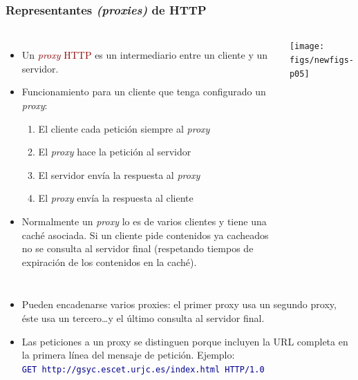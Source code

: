 \documentclass[hyperref={pdfpagelabels=true},ucs]{beamer}
\newcommand{\res}[1]{\textcolor{darkred}{#1}}
\begin{document}
\begin{frame}[fragile,shrink=15]
\frametitle{Representantes \emph{(proxies)} de HTTP}

\begin{columns}[c]
\column{80mm}

\begin{itemize}
\item Un \res{\textsl{proxy} HTTP} es un intermediario entre un
  cliente y un servidor.
\item Funcionamiento para un cliente que tenga configurado un \emph{proxy}: 
  \begin{enumerate}
  \item El cliente cada petición siempre al \emph{proxy}
  \item El \emph{proxy} hace la petición al servidor 
  \item El servidor envía la respuesta al \emph{proxy}
  \item El \emph{proxy} envía la respuesta al cliente
  \end{enumerate}
\item Normalmente un \emph{proxy} lo es de varios clientes y tiene una
  caché asociada. Si un cliente pide contenidos ya cacheados no se
  consulta al servidor final (respetando tiempos de expiración de los
  contenidos en la caché).
\end{itemize}

\column{70mm}
\begin{center}
\texttt{[image: figs/newfigs-p05]}
\end{center}

\end{columns}


\begin{itemize}

\item Pueden encadenarse varios proxies: el primer proxy usa un
  segundo proxy, éste usa un tercero\ldots y el último consulta al
  servidor final.

\item Las peticiones a un proxy se distinguen porque incluyen la URL
  completa en la primera línea del mensaje de petición. Ejemplo:\\
\textcolor{darkblue}{\Verb|GET http://gsyc.escet.urjc.es/index.html HTTP/1.0|}
\end{itemize}

\end{frame}
\end{document}
